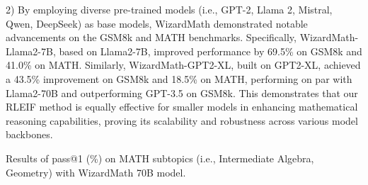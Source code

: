 2) By employing diverse pre-trained models (i.e., GPT-2, Llama 2, Mistral, Qwen, DeepSeek) as base models, WizardMath demonstrated notable advancements on the GSM8k and MATH benchmarks. Specifically, WizardMath-Llama2-7B, based on Llama2-7B, improved performance by 69.5\% on GSM8k and 41.0\% on MATH. Similarly, WizardMath-GPT2-XL, built on GPT2-XL, achieved a 43.5\% improvement on GSM8k and 18.5\% on MATH, performing on par with Llama2-70B and outperforming GPT-3.5 on GSM8k. This demonstrates that our RLEIF method is equally effective for smaller models in enhancing mathematical reasoning capabilities, proving its scalability and robustness across various model backbones.

  

   

\begin{table}[t]
    \centering
    \begin{minipage}{.45\textwidth}
        \centering
        \caption{Results of pass@1 (\%) on MATH subtopics (i.e., Intermediate Algebra, Geometry) with WizardMath 70B model. }
        \label{tab:math_topics}
    \end{minipage}%
    \hfill
    \begin{minipage}{.52\textwidth}
        \centering
        \caption{Explore the effects of PRM and IRM during PPO training. }
        \small
        \renewcommand{\arraystretch}{1.06}
\end{minipage}
\end{table}
